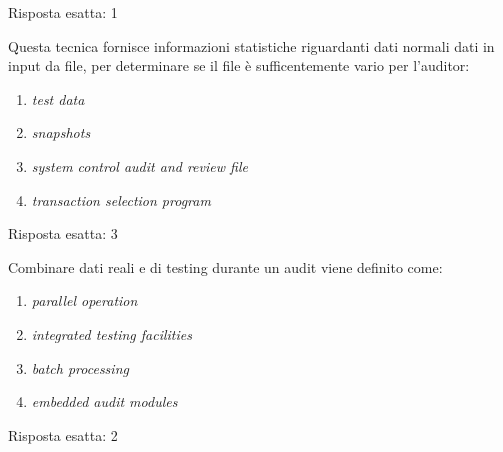 \begin{Answer} [
  ref={esCs4},
  number={4}
  ]

  \Question Risposta esatta: 1
\end{Answer}


\begin{Exercise} [
  title={Quiz},
  label={esCs5}
  ]

  \Question Questa tecnica fornisce informazioni statistiche riguardanti dati
normali dati in input da file, per determinare se il file \`e sufficentemente
vario per l'auditor:
\begin{enumerate}
\item \textit{test data}
\item \textit{snapshots}
\item \textit{system control audit and review file}
\item \textit{transaction selection program}
\end{enumerate}

\end{Exercise}

\begin{Answer} [
  ref={esCs5},
  number={5}
  ]

  \Question Risposta esatta: 3
\end{Answer}


\begin{Exercise} [
  title={Quiz},
  label={esCs6}
  ]

  \Question Combinare dati reali e di testing durante un audit viene definito
come:
\begin{enumerate}
\item \textit{parallel operation}
\item \textit{integrated testing facilities}
\item \textit{batch processing}
\item \textit{embedded audit modules}
\end{enumerate}

\end{Exercise}

\begin{Answer} [
  ref={esCs6},
  number={6}
  ]

  \Question Risposta esatta: 2
\end{Answer}


